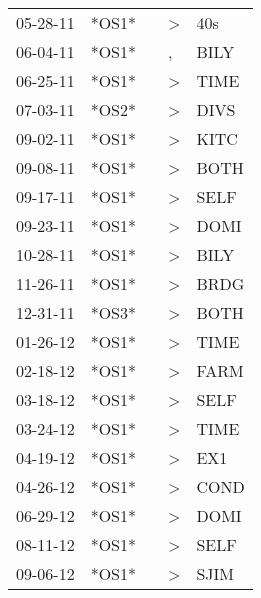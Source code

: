 \begin{supertabular}{p{0.07\textwidth}p{0.06\textwidth}p{0.02\textwidth}p{0.02\textwidth}p{0.06\textwidth}}
 05-28-11\textsuperscript{} &  *OS1* &   &  \textgreater &   40s\textsuperscript{} \\
 06-04-11\textsuperscript{} &  *OS1* &   &             , &  BILY\textsuperscript{} \\
 06-25-11\textsuperscript{} &  *OS1* &   &  \textgreater &  TIME\textsuperscript{} \\
 07-03-11\textsuperscript{} &  *OS2* &   &  \textgreater &  DIVS\textsuperscript{} \\
 09-02-11\textsuperscript{} &  *OS1* &   &  \textgreater &  KITC\textsuperscript{} \\
 09-08-11\textsuperscript{} &  *OS1* &   &  \textgreater &  BOTH\textsuperscript{} \\
 09-17-11\textsuperscript{} &  *OS1* &   &  \textgreater &  SELF\textsuperscript{} \\
 09-23-11\textsuperscript{} &  *OS1* &   &  \textgreater &  DOMI\textsuperscript{} \\
 10-28-11\textsuperscript{} &  *OS1* &   &  \textgreater &  BILY\textsuperscript{} \\
 11-26-11\textsuperscript{} &  *OS1* &   &  \textgreater &  BRDG\textsuperscript{} \\
 12-31-11\textsuperscript{} &  *OS3* &   &  \textgreater &  BOTH\textsuperscript{} \\
 01-26-12\textsuperscript{} &  *OS1* &   &  \textgreater &  TIME\textsuperscript{} \\
 02-18-12\textsuperscript{} &  *OS1* &   &  \textgreater &  FARM\textsuperscript{} \\
 03-18-12\textsuperscript{} &  *OS1* &   &  \textgreater &  SELF\textsuperscript{} \\
 03-24-12\textsuperscript{} &  *OS1* &   &  \textgreater &  TIME\textsuperscript{} \\
 04-19-12\textsuperscript{} &  *OS1* &   &  \textgreater &   EX1\textsuperscript{} \\
 04-26-12\textsuperscript{} &  *OS1* &   &  \textgreater &  COND\textsuperscript{} \\
 06-29-12\textsuperscript{} &  *OS1* &   &  \textgreater &  DOMI\textsuperscript{} \\
 08-11-12\textsuperscript{} &  *OS1* &   &  \textgreater &  SELF\textsuperscript{} \\
 09-06-12\textsuperscript{} &  *OS1* &   &  \textgreater &  SJIM\textsuperscript{} \\

\end{supertabular}
